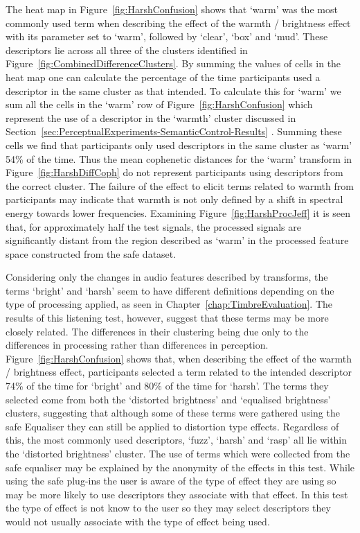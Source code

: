 			The heat map in Figure~\ref{fig:HarshConfusion} shows that `warm' was the most commonly used term
			when describing the effect of the warmth / brightness effect with its parameter set to `warm',
			followed by `clear', `box' and `mud'. These descriptors lie across all three of the clusters
			identified in Figure~\ref{fig:CombinedDifferenceClusters}. By summing the values of cells in the
			heat map one can calculate the percentage of the time participants used a descriptor in the same
			cluster as that intended. To calculate this for `warm' we sum all the cells in the `warm' row of
			Figure~\ref{fig:HarshConfusion} which represent the use of a descriptor in the `warmth' cluster
			discussed in Section~\ref{sec:PerceptualExperiments-SemanticControl-Results} . Summing these cells
			we find that participants only used descriptors in the same cluster as `warm' 54\% of the time.
			Thus the mean cophenetic distances for the `warm' transform in Figure~\ref{fig:HarshDiffCoph} do
			not represent participants using descriptors from the correct cluster. The failure of the effect to
			elicit terms related to warmth from participants may indicate that warmth is not only defined by a
			shift in spectral energy towards lower frequencies.  Examining Figure~\ref{fig:HarshProcJeff} it is
			seen that, for approximately half the test signals, the processed signals are significantly distant
			from the region described as `warm' in the processed feature space constructed from the
			\acrshort{safe} dataset.
			
			Considering only the changes in audio features described by transforms, the terms `bright' and
			`harsh' seem to have different definitions depending on the type of processing applied, as seen in
			Chapter~\ref{chap:TimbreEvaluation}. The results of this listening test, however, suggest that
			these terms may be more closely related. The differences in their clustering being due only to the
			differences in processing rather than differences in perception. Figure~\ref{fig:HarshConfusion}
			shows that, when describing the effect of the warmth / brightness effect, participants selected a
			term related to the intended descriptor 74\% of the time for `bright' and 80\% of the time for
			`harsh'. The terms they selected come from both the `distorted brightness' and `equalised
			brightness' clusters, suggesting that although some of these terms were gathered using the
			\acrshort{safe} Equaliser they can still be applied to distortion type effects. Regardless of this,
			the most commonly used descriptors, `fuzz', `harsh' and `rasp' all lie within the `distorted
			brightness' cluster. The use of terms which were collected from the \acrshort{safe} equaliser may
			be explained by the anonymity of the effects in this test. While using the \acrshort{safe} plug-ins
			the user is aware of the type of effect they are using so may be more likely to use descriptors
			they associate with that effect.  In this test the type of effect is not know to the user so they
			may select descriptors they would not usually associate with the type of effect being used.


